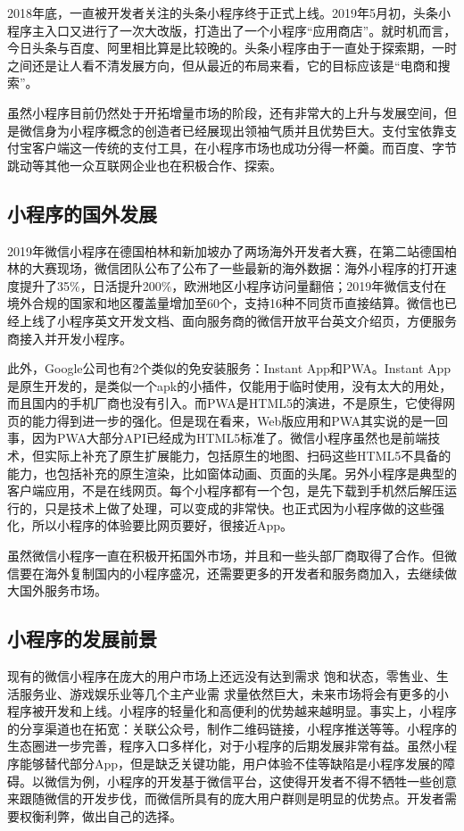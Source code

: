 \documentclass{article}
\begin{document}
2018年底，一直被开发者关注的头条小程序终于正式上线。2019年5月初，头条小程序主入口又进行了一次大改版，打造出了一个小程序“应用商店”。就时机而言，今日头条与百度、阿里相比算是比较晚的。头条小程序由于一直处于探索期，一时之间还是让人看不清发展方向，但从最近的布局来看，它的目标应该是“电商和搜索”。\par
虽然小程序目前仍然处于开拓增量市场的阶段，还有非常大的上升与发展空间，但是微信身为小程序概念的创造者已经展现出领袖气质并且优势巨大。支付宝依靠支付宝客户端这一传统的支付工具，在小程序市场也成功分得一杯羹。而百度、字节跳动等其他一众互联网企业也在积极合作、探索。
\subsection{小程序的国外发展}
2019年微信小程序在德国柏林和新加坡办了两场海外开发者大赛，在第二站德国柏林的大赛现场，微信团队公布了公布了一些最新的海外数据：海外小程序的打开速度提升了35\%，日活提升200\%，欧洲地区小程序访问量翻倍；2019年微信支付在境外合规的国家和地区覆盖量增加至60个，支持16种不同货币直接结算。微信也已经上线了小程序英文开发文档、面向服务商的微信开放平台英文介绍页，方便服务商接入并开发小程序。\par
此外，Google公司也有2个类似的免安装服务：Instant App和PWA。Instant App是原生开发的，是类似一个apk的小插件，仅能用于临时使用，没有太大的用处，而且国内的手机厂商也没有引入。而PWA是HTML5的演进，不是原生，它使得网页的能力得到进一步的强化。但是现在看来，Web版应用和PWA其实说的是一回事，因为PWA大部分API已经成为HTML5标准了。微信小程序虽然也是前端技术，但实际上补充了原生扩展能力，包括原生的地图、扫码这些HTML5不具备的能力，也包括补充的原生渲染，比如窗体动画、页面的头尾。另外小程序是典型的客户端应用，不是在线网页。每个小程序都有一个包，是先下载到手机然后解压运行的，只是技术上做了处理，可以变成的非常快。也正式因为小程序做的这些强化，所以小程序的体验要比网页要好，很接近App。\par
虽然微信小程序一直在积极开拓国外市场，并且和一些头部厂商取得了合作。但微信要在海外复制国内的小程序盛况，还需要更多的开发者和服务商加入，去继续做大国外服务市场。
\subsection{小程序的发展前景}
现有的微信小程序在庞大的用户市场上还远没有达到需求 饱和状态，零售业、生活服务业、游戏娱乐业等几个主产业需 求量依然巨大，未来市场将会有更多的小程序被开发和上线。小程序的轻量化和高便利的优势越来越明显。事实上，小程序的分享渠道也在拓宽：关联公众号，制作二维码链接，小程序推送等等。小程序的生态圈进一步完善，程序入口多样化，对于小程序的后期发展非常有益。虽然小程序能够替代部分App，但是缺乏关键功能，用户体验不佳等缺陷是小程序发展的障碍。以微信为例，小程序的开发基于微信平台，这使得开发者不得不牺牲一些创意来跟随微信的开发步伐，而微信所具有的庞大用户群则是明显的优势点。开发者需要权衡利弊，做出自己的选择。
\end{document}

